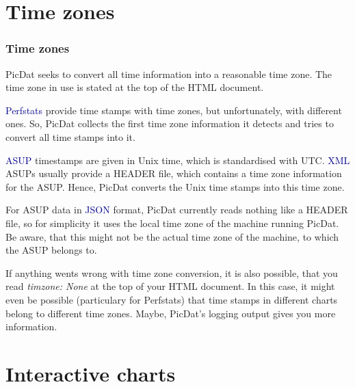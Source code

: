 \documentclass[8pt]{beamer}
\begin{document}
\section{Time zones}
\begin{frame}
\frametitle{Time zones}
PicDat seeks to convert all time information into a reasonable time zone. The time zone in use is stated at the top of the HTML document. 
\bigskip

\textcolor{darkblue}{Perfstats} provide time stamps with time zones, but unfortunately, with different ones. So, PicDat collects the first time zone information it detects and tries to convert all time stamps into it.
\bigskip

\textcolor{darkblue}{ASUP} timestamps are given in Unix time, which is standardised with UTC. \textcolor{darkblue}{XML} ASUPs usually provide a HEADER file, which contains a time zone information for the ASUP. Hence, PicDat converts the Unix time stamps into this time zone.
\bigskip

For ASUP data in \textcolor{darkblue}{JSON} format, PicDat currently reads nothing like a HEADER file, so for simplicity it uses the local time zone of the machine running PicDat. Be aware, that this might not be the actual time zone of the machine, to which the ASUP belongs to.
\bigskip

If anything wents wrong with time zone conversion, it is also possible, that you read \textit{timzone: None} at the top of your HTML document. In this case, it might even be possible (particulary for Perfstats) that time stamps in different charts belong to different time zones. Maybe, PicDat's logging output gives you more information.
\end{frame}

\section{Interactive charts}
\end{document}
